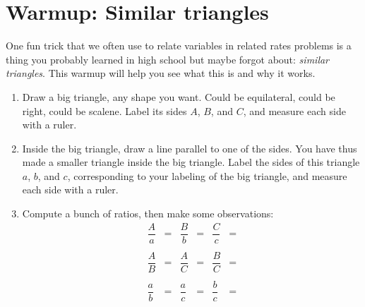 
\usetikzlibrary{shapes.geometric}


%


\allowdisplaybreaks
\section{Warmup: Similar triangles}

One fun trick that we often use to relate variables in related rates problems is a thing you probably learned in high school but maybe forgot about: \textit{similar triangles}. This warmup will help you see what this is and why it works.

\begin{enumerate}[leftmargin=15pt]
    \item Draw a big triangle, any shape you want. Could be equilateral, could be right, could be scalene. Label its sides $A$, $B$, and $C$, and measure each side with a ruler.
    \vfill
    \item Inside the big triangle, draw a line parallel to one of the sides. You have thus made a smaller triangle inside the big triangle. Label the sides of this triangle $a$, $b$, and $c$, corresponding to your labeling of the big triangle, and measure each side with a ruler.
    \item Compute a bunch of ratios, then make some observations:
    \begin{align*}
        \dfrac{A}{a} &= & \dfrac{B}{b} &= & \dfrac{C}{c} &= \\\\
        \dfrac{A}{B} &= & \dfrac{A}{C} &= & \dfrac{B}{C} &= \\\\
        \dfrac{a}{b} &= & \dfrac{a}{c} &= & \dfrac{b}{c} &=
    \end{align*}
\end{enumerate}


